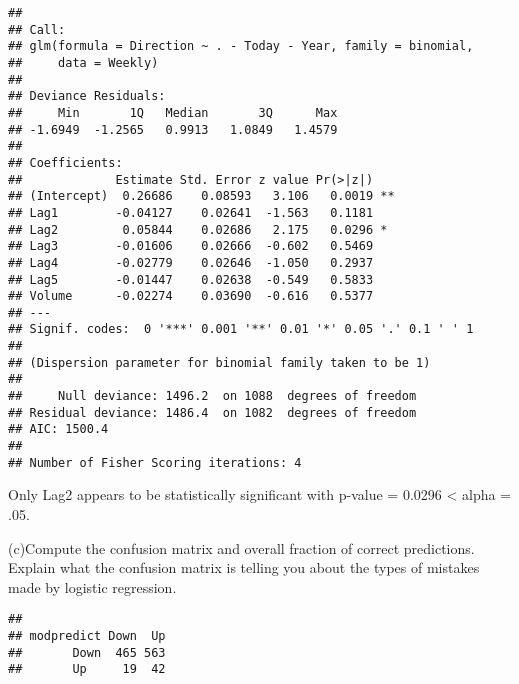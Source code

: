\documentclass[]{article}
\newenvironment{Shaded}{\begin{snugshade}}{\end{snugshade}}
\newcommand{\DecValTok}[1]{\textcolor[rgb]{0.00,0.00,0.81}{#1}}
\newcommand{\KeywordTok}[1]{\textcolor[rgb]{0.13,0.29,0.53}{\textbf{#1}}}
\newcommand{\NormalTok}[1]{#1}
\newcommand{\OperatorTok}[1]{\textcolor[rgb]{0.81,0.36,0.00}{\textbf{#1}}}
\newcommand{\StringTok}[1]{\textcolor[rgb]{0.31,0.60,0.02}{#1}}
\begin{document}
\begin{verbatim}
## 
## Call:
## glm(formula = Direction ~ . - Today - Year, family = binomial, 
##     data = Weekly)
## 
## Deviance Residuals: 
##     Min       1Q   Median       3Q      Max  
## -1.6949  -1.2565   0.9913   1.0849   1.4579  
## 
## Coefficients:
##             Estimate Std. Error z value Pr(>|z|)   
## (Intercept)  0.26686    0.08593   3.106   0.0019 **
## Lag1        -0.04127    0.02641  -1.563   0.1181   
## Lag2         0.05844    0.02686   2.175   0.0296 * 
## Lag3        -0.01606    0.02666  -0.602   0.5469   
## Lag4        -0.02779    0.02646  -1.050   0.2937   
## Lag5        -0.01447    0.02638  -0.549   0.5833   
## Volume      -0.02274    0.03690  -0.616   0.5377   
## ---
## Signif. codes:  0 '***' 0.001 '**' 0.01 '*' 0.05 '.' 0.1 ' ' 1
## 
## (Dispersion parameter for binomial family taken to be 1)
## 
##     Null deviance: 1496.2  on 1088  degrees of freedom
## Residual deviance: 1486.4  on 1082  degrees of freedom
## AIC: 1500.4
## 
## Number of Fisher Scoring iterations: 4
\end{verbatim}

Only Lag2 appears to be statistically significant with p-value = 0.0296
\textless{} alpha = .05.

(c)Compute the confusion matrix and overall fraction of correct
predictions. Explain what the confusion matrix is telling you about the
types of mistakes made by logistic regression.

\begin{Shaded}
\end{Shaded}

\begin{verbatim}
##           
## modpredict Down  Up
##       Down  465 563
##       Up     19  42
\end{verbatim}

\begin{Shaded}
\end{Shaded}
\end{document}
